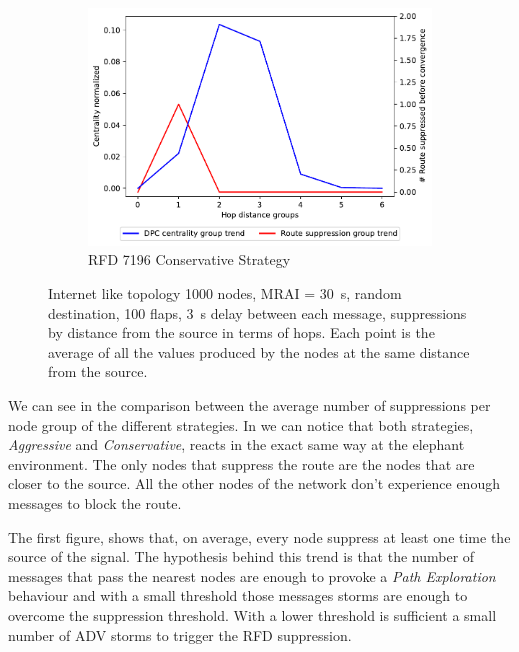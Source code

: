 \begin{figure}[h]
     \hfill
     \begin{subfigure}[b]{0.49\textwidth}
         \centering
         \includegraphics[width=\textwidth]{images/RFD/miceVSelephants/elephants/cisco_1000_RFD_7196_conservative_nodeConvergence_centVSsup_trend.pdf}
         \caption{RFD 7196 Conservative Strategy}
         \label{fig:1000_7196RFDC_cent_VS_sup_elephants}
     \end{subfigure}
		\caption{Internet like topology \num{1000} nodes, \ac{MRAI} = \SI{30}{\second},
		random destination, \num{100} flaps, \SI{3}{\second} delay between each
		message, suppressions by distance from the source in terms of hops.
		Each point is the average of all the values produced by the nodes at the
		same distance from the source.}
        \label{fig:1000_RFD_cent_VS_sup_elephants}
\end{figure}

We can see in  the comparison between
the average number of suppressions per node group of the different strategies.
In 
we can notice that both strategies, \textit{Aggressive} and \textit{Conservative},
reacts in the exact same way at the elephant environment.
The only nodes that suppress the route are the nodes that are closer to the source.
All the other nodes of the network don't experience enough messages to block
the route.

The first figure,  shows
that, on average, every node suppress at least one time the source of the
signal.
The hypothesis behind this trend is that the number of messages that pass the
nearest nodes are enough to provoke a \textit{Path Exploration} behaviour and
with a small threshold those messages storms are enough to overcome the suppression
threshold.
With a lower threshold is sufficient a small number of \ac{ADV} storms
to trigger the \ac{RFD} suppression.

